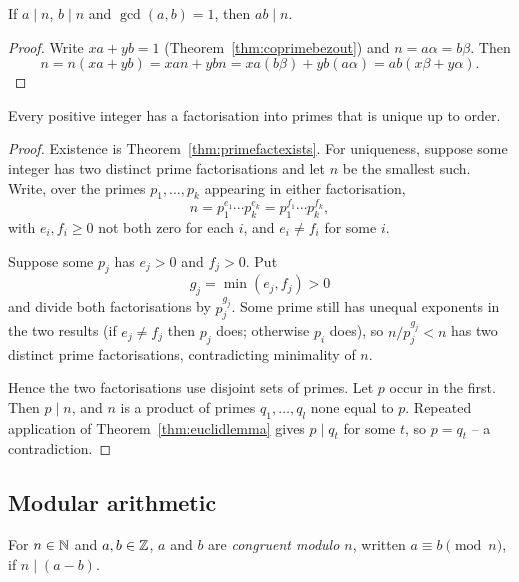 \documentclass[11pt]{article}
\begin{document}
\begin{theorem}
\label{thm:coprimedivides}
If $a\mid n$, $b\mid n$ and $\gcd(a,b)=1$, then $ab\mid n$.
\end{theorem}

\begin{proof}
Write $xa+yb=1$ (Theorem~\ref{thm:coprimebezout}) and $n=a\alpha=b\beta$. Then
\[
n = n(xa+yb) = xan+ybn = xa(b\beta)+yb(a\alpha) = ab(x\beta+y\alpha).
\]
\end{proof}

\begin{theorem}
\label{thm:fta}
Every positive integer has a factorisation into primes that is unique up to order.
\end{theorem}

\begin{proof}
Existence is Theorem~\ref{thm:primefactexists}. For uniqueness, suppose some integer has two distinct prime factorisations and let $n$ be the smallest such. Write, over the primes $p_1,\dots,p_k$ appearing in either factorisation,
\[
n=p_1^{e_1}\cdots p_k^{e_k}=p_1^{f_1}\cdots p_k^{f_k},
\]
with $e_i,f_i\ge0$ not both zero for each $i$, and $e_i\ne f_i$ for some $i$.

\medskip
\noindent Suppose some $p_j$ has $e_j>0$ and $f_j>0$. Put
\[
g_j=\min(e_j,f_j)>0
\]
and divide both factorisations by $p_j^{g_j}$. Some prime still has unequal exponents in the two results (if $e_j\ne f_j$ then $p_j$ does; otherwise $p_i$ does), so $n/p_j^{g_j}<n$ has two distinct prime factorisations, contradicting minimality of $n$.

\medskip
\noindent Hence the two factorisations use disjoint sets of primes. Let $p$ occur in the first. Then $p\mid n$, and $n$ is a product of primes $q_1,\dots,q_l$ none equal to $p$. Repeated application of Theorem~\ref{thm:euclidlemma} gives $p\mid q_t$ for some $t$, so $p=q_t$ -- a contradiction.
\end{proof}

\subsection{Modular arithmetic}
\label{sec:modarith}

\begin{definition}[Congruence]
For $n\in\mathbb{N}$ and $a,b\in\mathbb{Z}$, $a$ and $b$ are \emph{congruent modulo $n$}, written $a\equiv b\pmod n$, if $n\mid(a-b)$.
\end{definition}
\end{document}

